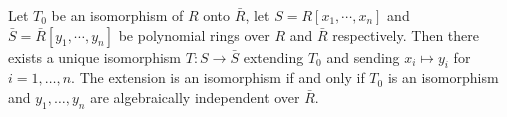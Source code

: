 Let $T_0$ be an isomorphism of $R$ onto $\bar{R}$, let $S = R[x_1, \cdots, x_n]$ and $\bar{S} = \bar{R}[y_1, \cdots, y_n]$ be polynomial rings over $R$ and $\bar{R}$ respectively. Then there exists a unique isomorphism $T: S \to \bar{S}$ extending $T_0$ and sending $x_i \mapsto y_i$ for $i = 1, \dots, n$. The extension is an isomorphism if and only if $T_0$ is an isomorphism and $y_1, \dots, y_n$ are algebraically independent over $\bar{R}$.
